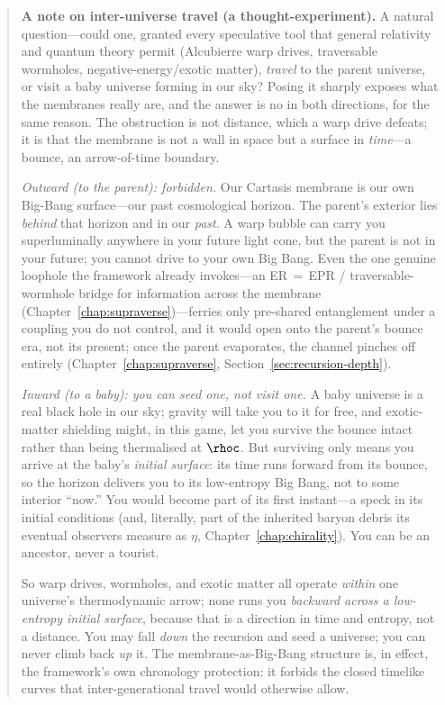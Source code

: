 \begin{quote}
\small
\textbf{A note on inter-universe travel (a thought-experiment).}\enspace
A natural question---could one, granted every speculative tool that general
relativity and quantum theory permit (Alcubierre warp drives, traversable wormholes,
negative-energy/exotic matter), \emph{travel} to the parent universe, or visit a baby
universe forming in our sky? Posing it sharply exposes what the membranes really are,
and the answer is no in both directions, for the same reason. The obstruction is not
distance, which a warp drive defeats; it is that the membrane is not a wall in space
but a surface in \emph{time}---a bounce, an arrow-of-time boundary.

\emph{Outward (to the parent): forbidden.} Our Cartasis membrane is our own
Big-Bang surface---our past cosmological horizon. The parent's exterior lies
\emph{behind} that horizon and in our \emph{past}. A warp bubble can carry you
superluminally anywhere in your future light cone, but the parent is not in your
future; you cannot drive to your own Big Bang. Even the one genuine loophole the
framework already invokes---an ER\,$=$\,EPR / traversable-wormhole bridge for
information across the membrane (Chapter~\ref{chap:supraverse})---ferries only
pre-shared entanglement under a coupling you do not control, and it would open onto
the parent's bounce era, not its present; once the parent evaporates, the channel
pinches off entirely (Chapter~\ref{chap:supraverse}, Section~\ref{sec:recursion-depth}).

\emph{Inward (to a baby): you can seed one, not visit one.} A baby universe is a real
black hole in our sky; gravity will take you to it for free, and exotic-matter
shielding might, in this game, let you survive the bounce intact rather than being
thermalised at $\rhoc$. But surviving only means you arrive at the baby's
\emph{initial surface}: its time runs forward from its bounce, so the horizon delivers
you to its low-entropy Big Bang, not to some interior ``now.'' You would become part
of its first instant---a speck in its initial conditions (and, literally, part of the
inherited baryon debris its eventual observers measure as $\eta$,
Chapter~\ref{chap:chirality}). You can be an ancestor, never a tourist.

So warp drives, wormholes, and exotic matter all operate \emph{within} one
universe's thermodynamic arrow; none runs you \emph{backward across a low-entropy
initial surface}, because that is a direction in time and entropy, not a distance. You
may fall \emph{down} the recursion and seed a universe; you can never climb back
\emph{up} it. The membrane-as-Big-Bang structure is, in effect, the framework's own
chronology protection: it forbids the closed timelike curves that inter-generational
travel would otherwise allow.
\end{quote}

